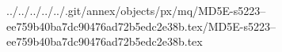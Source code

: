 ../../../../../.git/annex/objects/px/mq/MD5E-s5223--ee759b40ba7dc90476ad72b5edc2e38b.tex/MD5E-s5223--ee759b40ba7dc90476ad72b5edc2e38b.tex